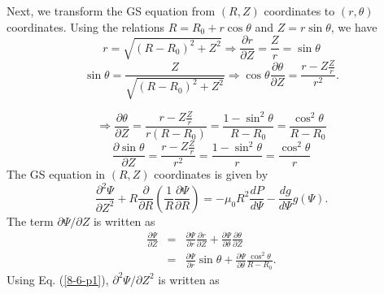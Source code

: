 \documentclass{article}
\begin{document}
\

\

Next, we transform the GS equation from $(R, Z)$ coordinates to $(r, \theta)$
coordinates. Using the relations $R = R_0 + r \cos \theta$ and $Z = r \sin
\theta$, we have
\begin{equation}
  r = \sqrt{(R - R_0)^2 + Z^2} \Rightarrow \frac{\partial r}{\partial Z} =
  \frac{Z}{r} = \sin \theta
\end{equation}
\begin{equation}
  \sin \theta = \frac{Z}{\sqrt{(R - R_0)^2 + Z^2}} \Rightarrow \cos \theta
  \frac{\partial \theta}{\partial Z} = \frac{r - Z \frac{Z}{r}}{r^2} .
\end{equation}

\begin{equation}
  \Rightarrow \frac{\partial \theta}{\partial Z} = \frac{r - Z \frac{Z}{r}}{r
  (R - R_0)} = \frac{1 - \sin^2 \theta}{R - R_0} = \frac{\cos^2 \theta}{R -
  R_0}
\end{equation}
\begin{equation}
  \frac{\partial \sin \theta}{\partial Z} = \frac{r - Z \frac{Z}{r}}{r^2} =
  \frac{1 - \sin^2 \theta}{r} = \frac{\cos^2 \theta}{r}
\end{equation}
The GS equation in $(R, Z)$ coordinates is given by
\begin{equation}
  \frac{\partial^2 \Psi}{\partial Z^2} + R \frac{\partial}{\partial R} \left(
  \frac{1}{R} \frac{\partial \Psi}{\partial R} \right) = - \mu_0 R^2 \frac{d
  P}{d \Psi} - \frac{d g}{d \Psi} g (\Psi) .
\end{equation}
The term $\partial \Psi / \partial Z$ is written as
\begin{eqnarray}
  \frac{\partial \Psi}{\partial Z} & = & \frac{\partial \Psi}{\partial r} 
  \frac{\partial r}{\partial Z} + \frac{\partial \Psi}{\partial \theta} 
  \frac{\partial \theta}{\partial Z} \nonumber\\
  & = & \frac{\partial \Psi}{\partial r} \sin \theta + \frac{\partial
  \Psi}{\partial \theta}  \frac{\cos^2 \theta}{R - R_0} .  \label{8-6-p1}
\end{eqnarray}
Using Eq. (\ref{8-6-p1}), $\partial^2 \Psi / \partial Z^2$ is written as
\end{document}

